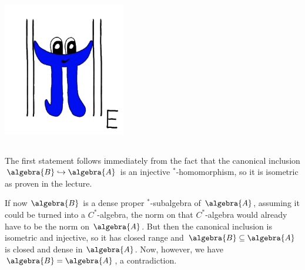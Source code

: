 \documentclass[a4paper]{article}
\begin{document}
\makeexheader

\begin{center}
    \includegraphics*[width=0.4\textwidth]{pi.png}
\end{center}

\subsection{}

The first statement follows immediately from the fact that the canonical inclusion $\algebra{B} \hookrightarrow \algebra{A}$ is an injective $^*$-homomorphism, so it is isometric as proven in the lecture.

If now $\algebra{B}$ is a dense proper $^*$-subalgebra of $\algebra{A}$, assuming it could be turned into a $C^*$-algebra, the norm on that $C^*$-algebra would already have to be the norm on $\algebra{A}$.
But then the canonical inclusion is isometric and injective, so it has closed range and $\algebra{B} \subseteq \algebra{A}$ is closed and dense in $\algebra{A}$.
Now, however, we have $\algebra{B} = \algebra{A}$, a contradiction.
\end{document}

